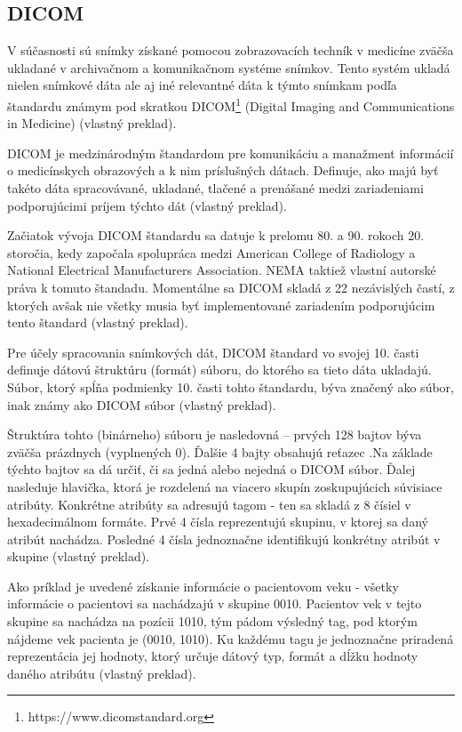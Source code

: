 \subsection {DICOM}\label{dicom}
V súčasnosti sú snímky získané pomocou zobrazovacích techník v medicíne zväčša ukladané v archivačnom a komunikačnom systéme snímkov. Tento systém ukladá nielen snímkové dáta ale aj iné relevantné dáta k týmto snímkam podľa štandardu známym pod skratkou DICOM\footnote{https://www.dicomstandard.org} (Digital Imaging and Communications in Medicine) \cite{Varma_2012} (vlastný preklad).

DICOM je medzinárodným štandardom pre komunikáciu a manažment informácií o medicínskych obrazových a k nim príslušných dátach. Definuje, ako majú byť takéto dáta spracovávané, ukladané, tlačené a prenášané medzi zariadeniami podporujúcimi príjem týchto dát \cite{about_dicomlibrary} (vlastný preklad).

Začiatok vývoja DICOM štandardu sa datuje k prelomu 80. a 90. rokoch 20. storočia, kedy započala spolupráca medzi American College of Radiology a National Electrical Manufacturers Association. NEMA taktiež vlastní autorské práva k tomuto štandadu. Momentálne sa DICOM skladá z 22 nezávislých častí, z ktorých avšak nie všetky musia byť implementované zariadením podporujúcim tento štandard \cite{dicom_history} (vlastný preklad).

Pre účely spracovania snímkových dát, DICOM štandard vo svojej 10. časti definuje dátovú štruktúru (formát) súboru, do ktorého sa tieto dáta ukladajú. Súbor, ktorý spĺňa podmienky 10. časti tohto štandardu, býva značený ako  súbor, inak známy ako DICOM súbor \cite{Varma_2012} (vlastný preklad).

Štruktúra tohto (binárneho) súboru je nasledovná -- prvých 128 bajtov býva zväčša prázdnych (vyplnených 0). Ďalšie 4 bajty obsahujú reťazec .\newline Na základe týchto bajtov sa dá určiť, či sa jedná alebo nejedná o DICOM súbor.
Ďalej nasleduje hlavička, ktorá je rozdelená na viacero skupín zoskupujúcich súvisiace atribúty. Konkrétne atribúty sa adresujú tagom - ten sa skladá z 8 čísiel v hexadecimálnom formáte. Prvé 4 čísla reprezentujú skupinu, v ktorej sa daný atribút nachádza. Posledné 4 čísla jednoznačne identifikujú konkrétny atribút v skupine \cite{Varma_2012} (vlastný preklad).

Ako príklad je uvedené získanie informácie o pacientovom veku - všetky informácie o pacientovi sa nachádzajú v skupine 0010. Pacientov vek v tejto skupine sa nachádza na pozícii 1010, tým pádom výsledný tag, pod ktorým nájdeme vek pacienta je (0010, 1010). Ku každému tagu je jednoznačne priradená reprezentácia jej hodnoty, ktorý určuje dátový typ, formát a dĺžku hodnoty daného atribútu  \cite{Varma_2012} (vlastný preklad).

